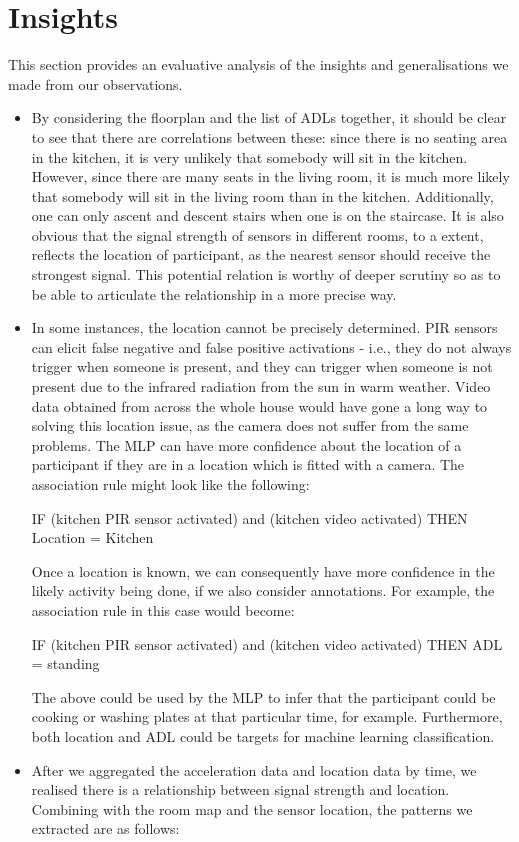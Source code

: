 \documentclass[fleqn,10pt]{SelfArx} %
\begin{document}
	\section{Insights}
This section provides an evaluative analysis of the insights and generalisations we made from our observations. 
\begin{itemize}
\item By considering the floorplan and the list of ADLs together, it should be clear to see that there are correlations between these: since there is no seating area in the kitchen, it is very unlikely that somebody will sit in the kitchen. However, since there are many seats in the living room, it is much more likely that somebody will sit in the living room than in the kitchen. Additionally, one can only ascent and descent stairs when one is on the staircase. It is also obvious that the signal strength of sensors in different rooms, to a extent, reflects the location of participant, as the nearest sensor should receive the strongest signal. This potential relation is worthy of deeper scrutiny so as to be able to articulate the relationship in a more precise way.
\item In some instances, the location cannot be precisely determined. PIR sensors can elicit false negative and false positive activations - i.e., they do not always trigger when someone is present, and they can trigger when someone is not present due to the infrared radiation from the sun in warm weather. Video data obtained from across the whole house would have gone a long way to solving this location issue, as the camera does not suffer from the same problems. The MLP can have more confidence about the location of a participant if they are in a location which is fitted with a camera. The association rule might look like the following:

IF (kitchen PIR sensor activated) and (kitchen video activated) THEN Location = Kitchen

Once a location is known, we can consequently have more confidence in the likely activity being done, if we also consider annotations. For example, the association rule in this case would become:

IF (kitchen PIR sensor activated) and (kitchen video activated) THEN ADL = standing

The above could be used by the MLP to infer that the participant could be cooking or washing plates at that particular time, for example. Furthermore, both location and ADL could be targets for machine learning classification.
\item After we aggregated the acceleration data and location data by time, we realised there is a relationship between signal strength and location. Combining with the room map and the sensor location, the patterns we extracted are as follows:


\end{itemize}
\end{document}
